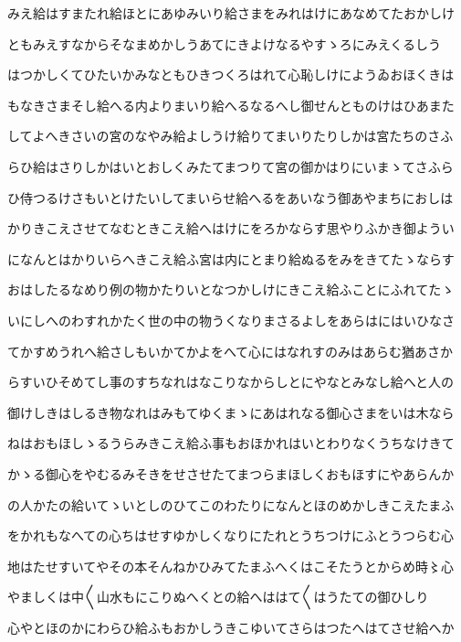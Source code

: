 \documentclass[a4paper,11pt,landscape]{ltjtarticle}
\begin{document}
\par\medskip
みえ給はすまたれ給ほとにあゆみいり給さまをみれはけにあなめてたおかしけ
\par\medskip
ともみえすなからそなまめかしうあてにきよけなるやすゝろにみえくるしう
\par\medskip
はつかしくてひたいかみなともひきつくろはれて心恥しけにようゐおほくきは
\par\medskip
もなきさまそし給へる内よりまいり給へるなるへし御せんとものけはひあまた
\par\medskip
してよへきさいの宮のなやみ給よしうけ給りてまいりたりしかは宮たちのさふ
\par\medskip
らひ給はさりしかはいとおしくみたてまつりて宮の御かはりにいまゝてさふら
\par\medskip
ひ侍つるけさもいとけたいしてまいらせ給へるをあいなう御あやまちにおしは
\par\medskip
かりきこえさせてなむときこえ給へはけにをろかならす思やりふかき御ようい
\par\medskip
になんとはかりいらへきこえ給ふ宮は内にとまり給ぬるをみをきてたゝならす
\par\medskip
おはしたるなめり例の物かたりいとなつかしけにきこえ給ふことにふれてたゝ
\par\medskip
いにしへのわすれかたく世の中の物うくなりまさるよしをあらはにはいひなさ
\par\medskip
てかすめうれへ給さしもいかてかよをへて心にはなれすのみはあらむ猶あさか
\par\medskip
らすいひそめてし事のすちなれはなこりなからしとにやなとみなし給へと人の
\par\medskip
御けしきはしるき物なれはみもてゆくまゝにあはれなる御心さまをいは木なら
\par\medskip
ねはおもほしゝるうらみきこえ給ふ事もおほかれはいとわりなくうちなけきて
\par\medskip
かゝる御心をやむるみそきをせさせたてまつらまほしくおもほすにやあらんか
\par\medskip
の人かたの給いてゝいとしのひてこのわたりになんとほのめかしきこえたまふ
\par\medskip
をかれもなへての心ちはせすゆかしくなりにたれとうちつけにふとうつらむ心
\par\medskip
地はたせすいてやその本そんねかひみてたまふへくはこそたうとからめ時〻心
\par\medskip
やましくは中〱山水もにこりぬへくとの給へははて〱はうたての御ひしり
\par\medskip
心やとほのかにわらひ給ふもおかしうきこゆいてさらはつたへはてさせ給へか
\par\medskip
\end{document}
